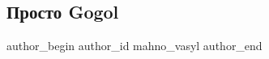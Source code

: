  
 
 
 
 
 
\subsection{Просто Gogol}
\label{sec:12_02_2022.stz.news.ua.zbruc.1.prosto_gogol}
 
\ifcmt
 author_begin
   author_id mahno_vasyl
 author_end
\fi
